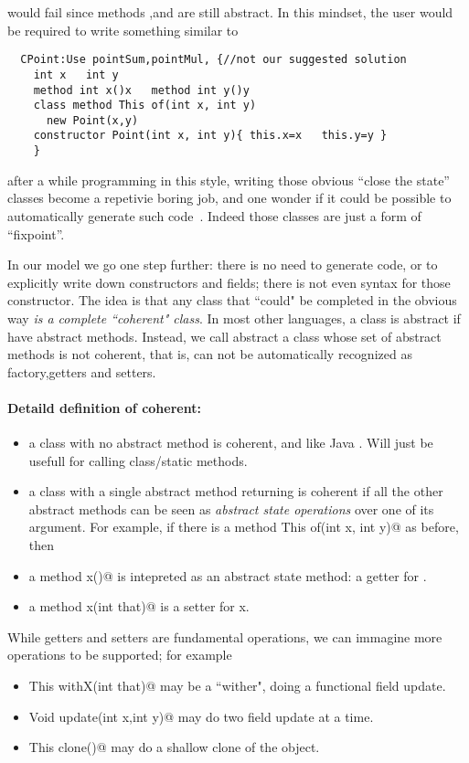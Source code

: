 \noindent would fail since methods \Q@x@,\Q@y@ and \Q@of@ are still abstract.
In this mindset, the user would be required to write something similar to

\begin{lstlisting}
  CPoint:Use pointSum,pointMul, {//not our suggested solution
    int x   int y
    method int x()x   method int y()y
    class method This of(int x, int y)
      new Point(x,y)
    constructor Point(int x, int y){ this.x=x   this.y=y }
    }
\end{lstlisting}

\noindent after a while programming in this style, 
writing those obvious ``close the state'' classes become a
repetivie boring job, and one wonder
if it could be possible to automatically generate such code~\cite{wang2016classless}.
Indeed those classes are just a form of ``fixpoint''.

In our model we go one step further: there is no need to generate code, or to explicitly
write down constructors and fields; there is not even syntax for those
constructor.
The idea is that any class that ``could" be completed in the obvious way
\emph{is a complete ``coherent" class}.
In most other languages, a class is abstract if have abstract methods.
Instead, we call abstract a class whose set of abstract methods is not
coherent, that is, can not be automatically recognized as factory,getters and setters.
  
\paragraph*{Detaild definition of coherent:}
\begin{itemize}
\item a class with no abstract method is coherent, and like Java \Q@Math@.
Will just be usefull for calling class/static methods.
\item a class with a single abstract \Q@class@ method returning \Q@This@
is coherent if all the other abstract methods can be seen as \emph{abstract state
operations} over one of its argument.
For example,
if there is a \Q@class method This of(int x, int y)@ as before,
then
\item a method \Q@int x()@ is intepreted as an abstract state method: a getter for \Q@x@.
\item a method \Q@Void x(int that)@ is a setter for x.
\end{itemize}

While getters and setters are fundamental operations, we can immagine
more operations to be supported; for example
\begin{itemize}
\item \Q@method This withX(int that)@
may be a ``wither", doing a functional field update.
\item \Q@method Void update(int x,int y)@
may do two field update at a time.
\item\Q@method This clone()@ may do a shallow clone of the object.
\end{itemize}

